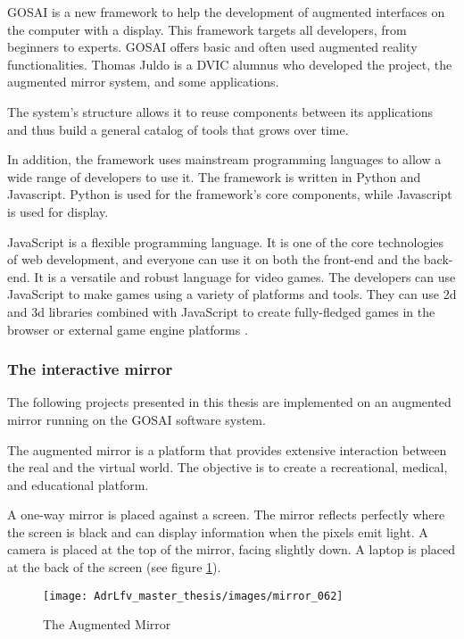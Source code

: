 GOSAI is a new framework to help the development of augmented interfaces on the computer with a display. This framework targets all developers, from beginners to experts. GOSAI offers
basic and often used augmented reality functionalities. Thomas Juldo is a DVIC alumnus who developed the project, the augmented mirror system, and some applications. 

The system's structure allows it to reuse components between its applications and thus build a general catalog of tools that grows over time.

In addition, the framework uses mainstream programming languages to allow a wide range of developers to
use it. The framework is written in Python and Javascript.
Python is used for the framework's core components,
while Javascript is used for display.

JavaScript is a flexible programming language. It is one of the core
technologies of web development, and everyone can use it on both the
front-end and the back-end.
It is a versatile and robust language for video games. The developers can use JavaScript to make games using a variety of platforms and tools. They can use 2d and 3d libraries combined with JavaScript to create fully-fledged games in the browser or external game engine platforms \cite{javascriptgaming}.

\subsubsection{The interactive mirror}

The following projects presented in this thesis are implemented on an augmented mirror running on the GOSAI software system.

The augmented mirror is a platform that provides extensive interaction between the real and the virtual world. The objective is to create a recreational, medical, and educational platform.

A one-way mirror is placed against a screen. The mirror reflects perfectly where the screen is black and can display information when the pixels emit light. A camera is placed at the top of the mirror, facing slightly down. A laptop is placed at the back of the screen (see figure \ref{fig:mirror_062}).

\begin{figure}[h]
    \centering
    \texttt{[image: AdrLfv\_master\_thesis/images/mirror\_062]}
    \caption{The Augmented Mirror}
    \label{fig:mirror_062}
\end{figure}

